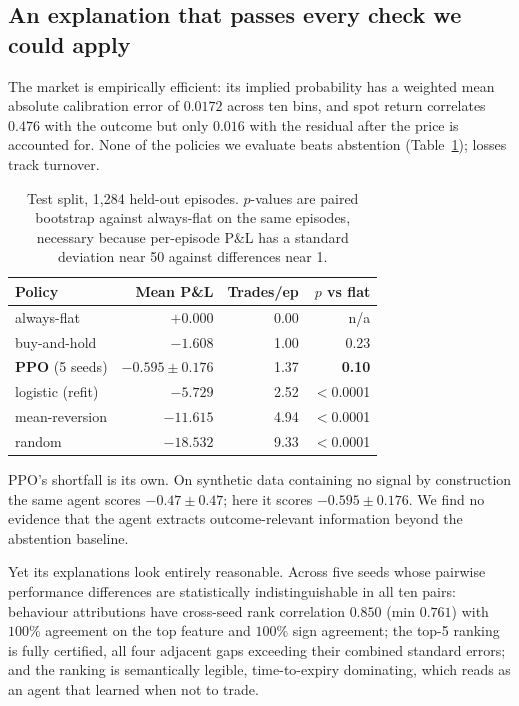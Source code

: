 \documentclass[10pt,twocolumn]{article}
\begin{document}
\subsection{An explanation that passes every check we could apply}
\label{sec:empty}

The market is empirically efficient: its implied probability has a weighted mean
absolute calibration error of $0.0172$ across ten bins, and spot return
correlates $0.476$ with the outcome but only $0.016$ with the residual after the
price is accounted for. None of the policies we evaluate beats abstention
(Table~\ref{tab:baselines}); losses track turnover.

\begin{table}[t]
\centering\small
\caption{Test split, 1{,}284 held-out episodes. $p$-values are paired bootstrap
against always-flat on the same episodes, necessary because per-episode P\&L has
a standard deviation near 50 against differences near 1.}
\label{tab:baselines}
\begin{tabular}{lrrr}
\toprule
Policy & Mean P\&L & Trades/ep & $p$ vs flat \\
\midrule
always-flat        & $+0.000$  & 0.00 & n/a \\
buy-and-hold       & $-1.608$  & 1.00 & 0.23 \\
\textbf{PPO} (5 seeds) & $\mathbf{-0.595 \pm 0.176}$ & 1.37 & \textbf{0.10} \\
logistic (refit)   & $-5.729$  & 2.52 & $<$0.0001 \\
mean-reversion     & $-11.615$ & 4.94 & $<$0.0001 \\
random             & $-18.532$ & 9.33 & $<$0.0001 \\
\bottomrule
\end{tabular}
\end{table}

PPO's shortfall is its own. On synthetic data containing no signal by
construction the same agent scores $-0.47 \pm 0.47$; here it scores
$-0.595 \pm 0.176$. We find no evidence that the agent extracts outcome-relevant
information beyond the abstention baseline.

Yet its explanations look entirely reasonable. Across five seeds whose pairwise
performance differences are statistically indistinguishable in all ten pairs:
behaviour attributions have cross-seed rank correlation $0.850$ (min $0.761$)
with $100\%$ agreement on the top feature and $100\%$ sign agreement; the top-5
ranking is fully certified, all four adjacent gaps exceeding their combined
standard errors; and the ranking is semantically legible, time-to-expiry
dominating, which reads as an agent that learned when not to trade.
\end{document}
